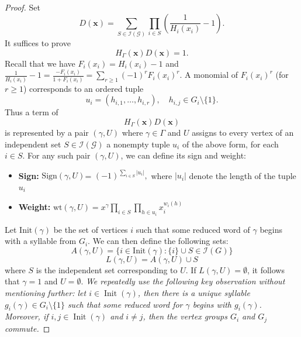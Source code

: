 \documentclass[11pt,reqno]{amsart}
\numberwithin{equation}{section} %
\theoremstyle{definition}
\theoremstyle{remark}
\numberwithin{equation}{section}
\begin{document}
\begin{proof}
    Set
\begin{equation*}
D(\mathbf{x}) = \sum_{S \in \mathcal I(\mathcal G)} \prod_{i \in S} \left( \frac{1}{H_i(x_i)} - 1 \right).
\end{equation*}
It suffices to prove
\begin{equation*}
H_{\Gamma}(\mathbf{x})D(\mathbf{x}) = 1.
\end{equation*}
Recall that we have $F_i(x_i) = H_i(x_i) - 1$ and $\frac{1}{H_i(x_i)} - 1 = \frac{-F_i(x_i)}{1 + F_i(x_i)} = \sum_{r \ge 1} (-1)^r F_i(x_i)^r$. 
A monomial of $F_i(x_i)^r$ (for $r\ge1$) corresponds to an ordered tuple
\begin{equation*}
u_i = (h_{i,1}, \dots, h_{i,r}), \quad h_{i,j} \in G_i \setminus \{1\}.
\end{equation*}
Thus a term of
\begin{equation*}
H_{\Gamma}(\mathbf{x})D(\mathbf{x})
\end{equation*}
is represented by a pair $(\gamma, U)$ where $\gamma \in \Gamma$ and $U$ assigns to every vertex of an independent set $S \in  \mathcal I(\mathcal G)$ a nonempty tuple $u_i$ of the above form, for each $i\in S$.
For any such pair $(\gamma, U)$, we can define its sign and weight:
\begin{itemize}
    \item \textbf{Sign:} $\mathrm{Sign}(\gamma,U)$= $(-1)^{\sum_{i \in S} |u_i|},$ where $|u_i|$ denote the length of the tuple $u_i$
    \item \textbf{Weight:} $\mathrm{wt}(\gamma,U) = x^\gamma \prod_{i \in S} \prod_{h \in u_i} x_i^{w_i(h)}$
\end{itemize}


Let $\mathrm{Init}(\gamma)$ be the set of vertices $i$ such that some reduced word of $\gamma$ begins with a syllable from $G_i$. We can then define the following sets:
\begin{equation*}
A(\gamma, U) = \{i \in \mathrm{Init}(\gamma) : \{i\} \cup S \in \mathcal{I}(G)\}
\end{equation*}
\begin{equation*}
L(\gamma, U) = A(\gamma, U) \cup S
\end{equation*}
where $S$ is the independent set corresponding to $U$.
If $L(\gamma, U) = \emptyset$, it follows that $\gamma = 1$ and $U = \emptyset$. \textit{
We repeatedly use the following key observation without mentioning further:
let \(i\in \operatorname{Init}(\gamma)\), then there is a unique syllable
\(g_i(\gamma)\in G_i\setminus\{1\}\) such that some reduced word for
\(\gamma\) begins with \(g_i(\gamma)\). Moreover, if
\(i,j\in\operatorname{Init}(\gamma)\) and \(i\ne j\), then the vertex groups
\(G_i\) and \(G_j\) commute.
}



\end{proof}
\end{document}
